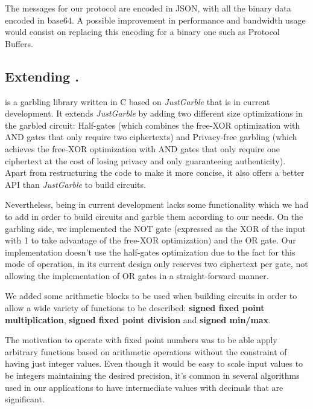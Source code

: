 The \MQTT{} messages for our protocol are encoded in JSON, with all the binary
data encoded in base64.  A possible improvement in performance and bandwidth
usage would consist on replacing this encoding for a binary one such as
Protocol Buffers.


\subsection{Extending \libgarble.}

\libgarble{} is a garbling library written in C based on \emph{JustGarble} that
is in current development.  It extends \emph{JustGarble} by adding two
different size optimizations in the garbled circuit: Half-gates (which combines
the free-XOR optimization with AND gates that only require two ciphertexts) and
Privacy-free garbling (which achieves the free-XOR optimization with AND gates
that only require one ciphertext at the cost of losing privacy and only
guaranteeing authenticity).  Apart from restructuring the code to make it more
concise, it also offers a better API than \emph{JustGarble} to build circuits.

Nevertheless, \libgarble{} being in current development lacks some
functionality which we had to add in order to build circuits and garble them
according to our needs.  On the garbling side, we implemented the NOT gate
(expressed as the XOR of the input with 1 to take advantage of the free-XOR
optimization) and the OR gate.  Our implementation doesn't use the half-gates
optimization due to the fact for this mode of operation, \libgarble{} in its
current design only reserves two ciphertext per gate, not allowing the
implementation of OR gates in a straight-forward manner.

We added some arithmetic blocks to be used when building circuits in order to
allow a wide variety of functions to be described: \textbf{signed fixed point
multiplication}, \textbf{signed fixed point division} and \textbf{signed
min/max}.

The motivation to operate with fixed point numbers was to be able apply
arbitrary functions based on arithmetic operations without the constraint of
having just integer values.  Even though it would be easy to scale input values
to be integers maintaining the desired precision, it's common in several
algorithms used in our applications to have intermediate values with decimals
that are significant.

